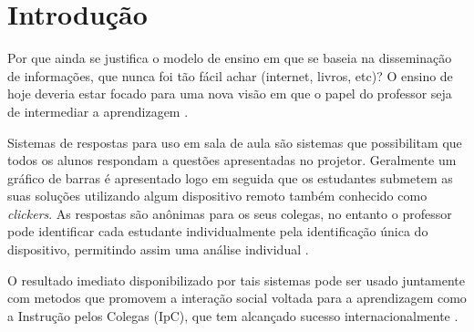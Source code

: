 \chapter{Introdução}

Por que ainda se justifica o modelo de ensino em que se baseia
na disseminação de informações, que nunca foi tão fácil achar (internet,
livros, etc)? O ensino de hoje deveria estar focado para uma nova
visão em que o papel do professor seja de intermediar a aprendizagem \cite{Araujo2013}.

Sistemas de respostas para uso em sala de aula são sistemas que possibilitam que todos os alunos
respondam a questões apresentadas no projetor. Geralmente um gráfico de barras
é apresentado logo em seguida que os estudantes submetem as suas soluções
utilizando algum dispositivo remoto também conhecido como \textit{clickers}. As respostas são anônimas para os seus colegas,
no entanto o professor pode identificar cada estudante individualmente pela
identificação única do dispositivo, permitindo assim uma análise individual \cite{Kay2009}.

O resultado imediato disponibilizado por tais sistemas pode ser usado juntamente
com metodos que promovem a interação social voltada para a aprendizagem como a
Instrução pelos Colegas (IpC), que tem alcançado sucesso internacionalmente \cite{Araujo2013}.

